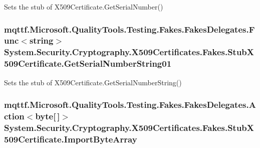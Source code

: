 Sets the stub of X509\-Certificate.\-Get\-Serial\-Number()

\hypertarget{class_system_1_1_security_1_1_cryptography_1_1_x509_certificates_1_1_fakes_1_1_stub_x509_certificate_a5f0772ea53aebaf182afbcadb75f357c}{
\subsubsection[{Get\-Serial\-Number\-String01}]{\setlength{\rightskip}{0pt plus 5cm}mqttf.\-Microsoft.\-Quality\-Tools.\-Testing.\-Fakes.\-Fakes\-Delegates.\-Func$<$string$>$ System.\-Security.\-Cryptography.\-X509\-Certificates.\-Fakes.\-Stub\-X509\-Certificate.\-Get\-Serial\-Number\-String01}}\label{class_system_1_1_security_1_1_cryptography_1_1_x509_certificates_1_1_fakes_1_1_stub_x509_certificate_a5f0772ea53aebaf182afbcadb75f357c}


Sets the stub of X509\-Certificate.\-Get\-Serial\-Number\-String()

\hypertarget{class_system_1_1_security_1_1_cryptography_1_1_x509_certificates_1_1_fakes_1_1_stub_x509_certificate_aaef214bfaef049fc7dda4081b8ee140f}{
\subsubsection[{Import\-Byte\-Array}]{\setlength{\rightskip}{0pt plus 5cm}mqttf.\-Microsoft.\-Quality\-Tools.\-Testing.\-Fakes.\-Fakes\-Delegates.\-Action$<$byte\mbox{[}$\,$\mbox{]}$>$ System.\-Security.\-Cryptography.\-X509\-Certificates.\-Fakes.\-Stub\-X509\-Certificate.\-Import\-Byte\-Array}}\label{class_system_1_1_security_1_1_cryptography_1_1_x509_certificates_1_1_fakes_1_1_stub_x509_certificate_aaef214bfaef049fc7dda4081b8ee140f}


